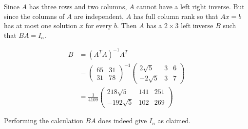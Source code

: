\documentclass{article}
\begin{document}
Since $A$ has three rows and two columns, $A$ cannot have a left right inverse. But since the columns of $A$ are independent, $A$ has full column rank so that $Ax = b$  has at most one solution $x$ for every $b$. Then $A$ has a $2 \times 3$ left inverse $B$ such that $BA = I_n$. 

\begin{align*}
B &= (A^TA)^{-1}A^T \\
&= \begin{pmatrix}
65 & 31 \\ 31 & 78
\end{pmatrix}^{-1} \begin{pmatrix}
2\sqrt{5} & 3 & 6 \\
-2\sqrt{5} & 3 & 7
\end{pmatrix}\\
&= \frac{1}{4109} \begin{pmatrix}
218\sqrt{5} & 141 & 251 \\ -192\sqrt{5} & 102 & 269
\end{pmatrix}
\end{align*}

Performing the calculation $BA$ does indeed give $I_n$ as claimed. 
\end{document}
